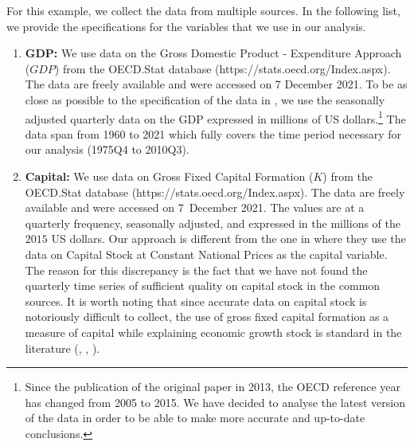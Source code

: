 \documentclass[a4paper,12pt]{article}
\begin{document}
For this example, we collect the data from multiple sources. In the following list, we provide the specifications for the variables that we use in our analysis.

\begin{enumerate}
\item \textbf{GDP:} We use data on the Gross Domestic Product - Expenditure Approach ($GDP$) from the OECD.Stat \nocite{OECD} database (https://stats.oecd.org/Index.aspx). The data are freely available and were accessed on 7 December 2021. To be as close as possible to the specification of the data in \cite{Zhang2012}, we use the seasonally adjusted quarterly data on the GDP expressed in millions of  US dollars.\footnote{Since the publication of the original paper in 2013, the OECD reference year has changed from 2005 to 2015. We have decided to analyse the latest version of the data in order to be able to make more accurate and up-to-date conclusions.} The data span from 1960 to 2021 which fully covers the time period necessary for our analysis (1975Q4 to 2010Q3). 
\item \textbf{Capital:} We use data on Gross Fixed Capital Formation ($K$) from the OECD.Stat \nocite{OECD} database (https://stats.oecd.org/Index.aspx). The data are freely available and were accessed on 7~December 2021. The values are at a quarterly frequency, seasonally adjusted, and expressed in the millions of the $2015$ US dollars.  Our approach is different from the one in \cite{Zhang2012} where they use the data on Capital Stock at Constant National Prices as the capital variable. The reason for this discrepancy is the fact that we have not found the quarterly time series of sufficient quality on capital stock in the common sources. It is worth noting that since accurate data on capital stock is notoriously difficult to collect, the use of gross fixed capital formation as a measure of capital while explaining economic growth stock is standard in the literature (\cite{Sharma1994}, \cite{Lee2002}, \cite{Lee2005}).

\end{enumerate}
\end{document}
